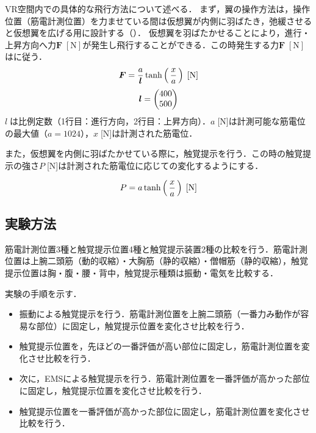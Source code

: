 \begin{small}

        VR空間内での具体的な飛行方法について述べる．
        まず，翼の操作方法は，操作位置（筋電計測位置）を力ませている間は仮想翼が内側に羽ばたき，弛緩させると仮想翼を広げる用に設計する（）．
        仮想翼を羽ばたかせることにより，進行・上昇方向へ力$\bm{F}\;[\mathrm{N}]$が発生し飛行することができる．この時発生する力$\bm{F}\;[\mathrm{N}]$はに従う．
        \begin{eqnarray}
                \equlabel{force}
                \bm{F}=\frac{a}{\bm{l}}  \tanh\left(\,\frac{x}{a}\,\right) \;[\mathrm{N}]
        \end{eqnarray}
        \begin{eqnarray}
                \equlabel{force_prop}
                \bm{l}=\begin{pmatrix}400 \\ 500 \end{pmatrix}
        \end{eqnarray}
        $l\;$は比例定数（1行目：進行方向，2行目：上昇方向）．$a\;$[N]は計測可能な筋電位の最大値（$a=1024$），$x\;$[N]は計測された筋電位．

        また，仮想翼を内側に羽ばたかせている際に，触覚提示を行う．この時の触覚提示の強さ$P\;$[N]は計測された筋電位に応じての変化するようにする．
        
        \begin{eqnarray}
                \equlabel{haptics}
                P=a \tanh\left(\,\frac{x}{a}\,\right) \;[\mathrm{N}]
        \end{eqnarray}
        
  \subsection{実験方法}
        筋電計測位置3種と触覚提示位置4種と触覚提示装置2種の比較を行う．筋電計測位置は上腕二頭筋（動的収縮）・大胸筋（静的収縮）・僧帽筋（静的収縮），触覚提示位置は胸・腹・腰・背中，触覚提示種類は振動・電気を比較する．

        実験の手順を示す．
        \begin{itemize}
        \item 振動による触覚提示を行う．筋電計測位置を上腕二頭筋（一番力み動作が容易な部位）に固定し，触覚提示位置を変化させ比較を行う．
        \item 触覚提示位置を，先ほどの一番評価が高い部位に固定し，筋電計測位置を変化させ比較を行う．
        \item 次に，EMSによる触覚提示を行う．筋電計測位置を一番評価が高かった部位に固定し，触覚提示位置を変化させ比較を行う．
        \item 触覚提示位置を一番評価が高かった部位に固定し，筋電計測位置を変化させ比較を行う．
        \end{itemize}



\end{small}
